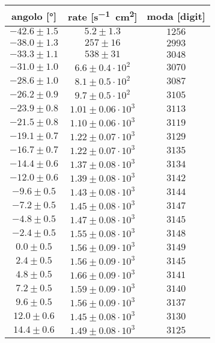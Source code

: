 \begin{table}[h]
\centering

\begin{tabular}{c|c|c}
angolo [\si{\degree}] & rate  [\si{s^{-1}cm^2}] & moda [digit] \\
\hline
$ -42.6 \pm 1.5 $ & $ 5.2 \pm 1.3 $ & $ 1256 $ \\ 
$ -38.0 \pm 1.3 $ & $ 257 \pm 16 $ & $ 2993 $ \\ 
$ -33.3 \pm 1.1 $ & $ 538 \pm 31 $ & $ 3048 $ \\ 
$ -31.0 \pm 1.0 $ & $ 6.6 \pm 0.4   \cdot 10^{2} $ & $ 3070 $ \\ 
$ -28.6 \pm 1.0 $ & $ 8.1 \pm 0.5   \cdot 10^{2} $ & $ 3087 $ \\ 
$ -26.2 \pm 0.9 $ & $ 9.7 \pm 0.5   \cdot 10^{2} $ & $ 3105 $ \\ 
$ -23.9 \pm 0.8 $ & $ 1.01 \pm 0.06 \cdot 10^{3} $ & $ 3113 $ \\ 
$ -21.5 \pm 0.8 $ & $ 1.10 \pm 0.06 \cdot 10^{3} $ & $ 3119 $ \\ 
$ -19.1 \pm 0.7 $ & $ 1.22 \pm 0.07 \cdot 10^{3} $ & $ 3129 $ \\ 
$ -16.7 \pm 0.7 $ & $ 1.22 \pm 0.07 \cdot 10^{3} $ & $ 3135 $ \\ 
$ -14.4 \pm 0.6 $ & $ 1.37 \pm 0.08 \cdot 10^{3} $ & $ 3134 $ \\ 
$ -12.0 \pm 0.6 $ & $ 1.39 \pm 0.08 \cdot 10^{3} $ & $ 3142 $ \\ 
$ -9.6 \pm 0.5 $ & $ 1.43 \pm 0.08  \cdot 10^{3} $ & $ 3144 $ \\ 
$ -7.2 \pm 0.5 $ & $ 1.45 \pm 0.08  \cdot 10^{3} $ & $ 3147 $ \\ 
$ -4.8 \pm 0.5 $ & $ 1.47 \pm 0.08  \cdot 10^{3} $ & $ 3145 $ \\ 
$ -2.4 \pm 0.5 $ & $ 1.55 \pm 0.08  \cdot 10^{3} $ & $ 3148 $ \\ 
$ 0.0 \pm 0.5 $ & $ 1.56 \pm 0.09   \cdot 10^{3} $ & $ 3149 $ \\ 
$ 2.4 \pm 0.5 $ & $ 1.56 \pm 0.09   \cdot 10^{3} $ & $ 3145 $ \\ 
$ 4.8 \pm 0.5 $ & $ 1.66 \pm 0.09   \cdot 10^{3} $ & $ 3141 $ \\ 
%
$ 7.2 \pm 0.5 $ & $ 1.59 \pm 0.09   \cdot 10^{3} $ & $ 3140 $ \\ 
$ 9.6 \pm 0.5 $ & $ 1.56 \pm 0.09   \cdot 10^{3} $ & $ 3137 $ \\ 
$ 12.0 \pm 0.6 $ & $ 1.45 \pm 0.08  \cdot 10^{3} $ & $ 3130 $ \\ 
$ 14.4 \pm 0.6 $ & $ 1.49 \pm 0.08  \cdot 10^{3} $ & $ 3125 $ \\ 

\end{tabular}
\end{table}
